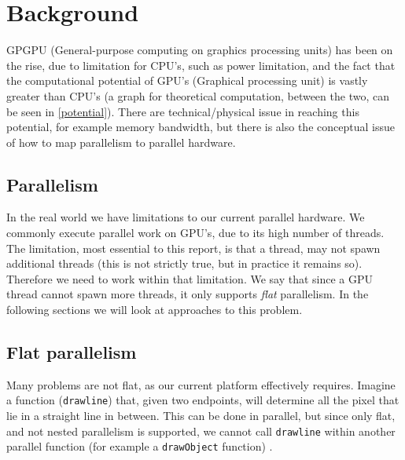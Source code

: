 \section{Background}
GPGPU (General-purpose computing on graphics processing units) has been on the rise, due to limitation for CPU's, such as power limitation, and the fact that the computational potential of GPU's (Graphical processing unit) is vastly greater than CPU's \cite{cpu-vs-gpu} (a graph for theoretical computation, between the two, can be seen in \ref{potential}). There are technical/physical issue in reaching this potential, for example memory bandwidth, but there is also the conceptual issue of how to map parallelism to parallel hardware.
\begin{comment}
A common way to increase computer performance, is to increase the capacity for parallelism. For practical usage, however, this is difficult to implement, due to low-level GPU-specific languages requiring domain specific knowledge to make full use of that capacity. A vast amount of work has gone into transforming high-level hardware-agnostic code into these low-level GPU-specific languages \cite{inc-flat}. 
\end{comment}

\subsection{Parallelism} 
In the real world we have limitations to our current parallel hardware. We commonly execute parallel work on GPU's, due to its high number of threads. The limitation, most essential to this report, is that a thread, may not spawn additional threads (this is not strictly true, but in practice it remains so). Therefore we need to work within that limitation. We say that since a GPU thread cannot spawn more threads, it only supports \textit{flat} parallelism. In the following sections we will look at approaches to this problem.    

\subsection{Flat parallelism}
Many problems are not flat, as our current platform effectively requires. Imagine a function (\texttt{drawline}) that, given two endpoints, will determine all the pixel that lie in a straight line in between. This can be done in parallel, but since only flat, and not nested parallelism is supported, we cannot call \texttt{drawline} within another parallel function (for example a \texttt{drawObject} function) \cite{flat}. 

